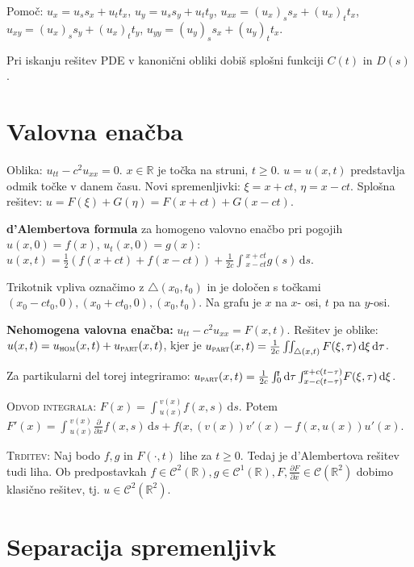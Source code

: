 \documentclass[8pt,a4paper]{amsart}
\theoremstyle{definition} %
\theoremstyle{plain} %
\newcommand{\dd}[1]{\ensuremath{\,\mathrm{d}#1}}
\let\oldint\int
\renewcommand{\int}{\oldint \!}
\newcommand{\R}{\mathbb R}
\begin{document}
Pomoč: $u_x = u_s s_x + u_t t_x$, $u_y = u_s s_y + u_t t_y$, $u_{xx} = (u_x)_s
s_x + (u_x)_t t_x$, $u_{xy} = (u_x)_s s_y + (u_x)_t t_y$,  $u_{yy} = (u_y)_s s_x
+ (u_y)_t t_x$.

Pri iskanju rešitev PDE v kanonični obliki dobiš splošni funkciji $C(t)$ in
$D(s)$.


\section*{Valovna enačba}

Oblika: $u_{tt} - c^2u_{xx} = 0$. $x \in \R$ je točka na struni, $t \geq 0$. $u
= u(x,t)$ predstavlja odmik točke v danem času. Novi spremenljivki: $\xi =
x+ct$, $\eta = x-ct$. Splošna rešitev: $u = F(\xi) + G(\eta) = F(x+ct) +
G(x-ct)$.

\textbf{d'Alembertova formula} za homogeno valovno enačbo pri pogojih $u(x,0) =
f(x)$, $u_t(x,0)=g(x)$: $ u(x,t) = \frac{1}{2}(f(x+ct)+f(x-ct)) + \frac{1}{2c}
\int_{x-ct}^{x+ct} g(s) \dd{s}.  $

Trikotnik vpliva označimo z $\bigtriangleup(x_0,t_0)$ in je določen s točkami
$(x_0-ct_0,0), (x_0+ct_0,0), (x_0,t_0)$. Na grafu je $x$ na $x$- osi, $t$ pa na
$y$-osi.

\textbf{Nehomogena valovna enačba:} $u_{tt} - c^2u_{xx} = F(x,t)$. Rešitev je
oblike: $u(x,t) = u_{\text{\textsc{hom}}}(x,t) + u_{\text{\textsc{part}}}(x,t)$,
kjer je $ u_{\text{\textsc{part}}}(x,t) = \frac{1}{2c} \iint_{\bigtriangleup
(x,t)}F(\xi,\tau)\dd{\xi} \dd{\tau}$.

Za partikularni del torej integriramo: $ u_{\text{\textsc{part}}}(x,t) =
\frac{1}{2c} \int_0^t \dd{\tau}
\int_{x-c(t-\tau)}^{x+c(t-\tau)}F(\xi,\tau)\dd{\xi}$.

\textsc{Odvod integrala:} $F(x) = \int_{u(x)}^{v(x)}f(x,s)\dd{s}$. Potem
$F'(x) =  \int_{u(x)}^{v(x)} \frac{\partial}{\partial x}f(x,s)\dd{s} +
f(x,(v(x))v'(x) - f(x,u(x))u'(x)$.

\textsc{Trditev:} Naj bodo $f, g$ in $F(\cdot ,t)$ lihe za $t \geq 0$. Tedaj je
d'Alembertova rešitev tudi liha. Ob predpostavkah $f \in \mathcal{C}^2(\R ), g
\in \mathcal{C}^1(\R ), F, \frac{\partial F}{\partial x} \in \mathcal{C}(\R^2 )$
dobimo klasično rešitev, tj. $u \in \mathcal{C}^2(\R^2 )$.


\section*{Separacija spremenljivk}
\end{document}

